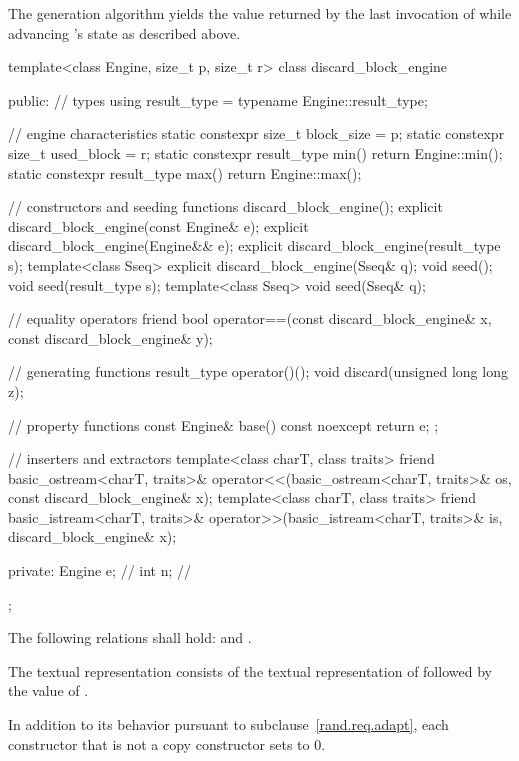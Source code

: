 \pnum
The generation algorithm
yields the value returned by the last invocation of 
 while advancing 's state as described above.

%
%
\begin{codeblock}
template<class Engine, size_t p, size_t r>
  class discard_block_engine {
  public:
    // types
    using result_type = typename Engine::result_type;

    // engine characteristics
    static constexpr size_t block_size = p;
    static constexpr size_t used_block = r;
    static constexpr result_type min() { return Engine::min(); }
    static constexpr result_type max() { return Engine::max(); }

    // constructors and seeding functions
    discard_block_engine();
    explicit discard_block_engine(const Engine& e);
    explicit discard_block_engine(Engine&& e);
    explicit discard_block_engine(result_type s);
    template<class Sseq> explicit discard_block_engine(Sseq& q);
    void seed();
    void seed(result_type s);
    template<class Sseq> void seed(Sseq& q);

    // equality operators
    friend bool operator==(const discard_block_engine& x, const discard_block_engine& y);

    // generating functions
    result_type operator()();
    void discard(unsigned long long z);

    // property functions
    const Engine& base() const noexcept { return e; };

    // inserters and extractors
    template<class charT, class traits>
      friend basic_ostream<charT, traits>&
        operator<<(basic_ostream<charT, traits>& os, const discard_block_engine& x);
    template<class charT, class traits>
      friend basic_istream<charT, traits>&
        operator>>(basic_istream<charT, traits>& is, discard_block_engine& x);

  private:
    Engine e;   // \expos
    int n;      // \expos
  };
\end{codeblock}

\pnum
The following relations shall hold:
and
  .

\pnum
The textual representation
consists of
 the textual representation of 
followed by
 the value of .

\pnum
In addition to its behavior
pursuant to subclause~\ref{rand.req.adapt},
each constructor%
that is not a copy constructor
sets  to $0$.


